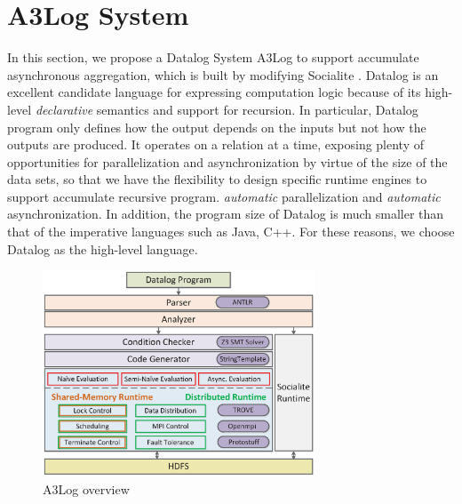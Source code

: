 \section{A3Log System}
\label{sec:system}

In this section, we propose a Datalog System A3Log to support accumulate asynchronous aggregation, which is built by modifying Socialite \cite{Lam:2013:SDE:2510649.2511289,Seo:2013:DSD:2556549.2556572}. Datalog is an excellent candidate language for expressing computation logic because of its high-level \emph{declarative} semantics and support for recursion. In particular, Datalog program only defines how the output depends on the inputs but not how the outputs are produced. It operates on a relation at a time, exposing plenty of opportunities for parallelization and asynchronization by virtue of the size of the data sets, so that we have the flexibility to design specific runtime engines to support accumulate recursive program. \emph{automatic} parallelization and \emph{automatic} asynchronization. In addition, the program size of Datalog is much smaller than that of the imperative languages such as Java, C++. For these reasons, we choose Datalog as the high-level language.

\begin{figure}[!t]
    \centering
  \includegraphics[width=3.2in]{fig/overview2}
  \vspace{-0.1in}
  \caption{A3Log overview}
  \label{fig:overview}
  \vspace{-0.2in}
\end{figure}

